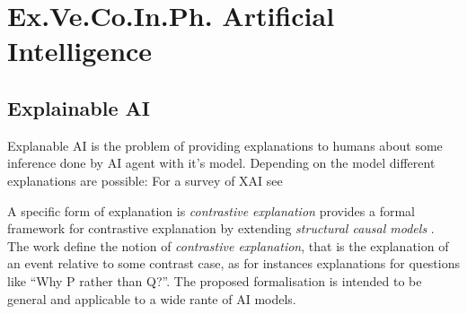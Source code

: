 \section{Ex.Ve.Co.In.Ph. Artificial Intelligence}
\subsection{Explainable AI} Explanable AI is the problem of providing
explanations to humans about some inference done by AI agent with it's
model. Depending on the model different explanations are possible:
For a survey of XAI see \cite{arrieta2020explainable}

A specific form of explanation is \emph{contrastive explanation}
\cite{miller2018contrastive} provides a formal framework for
contrastive explanation by extending \emph{structural causal models}
\cite{halpern2005causes1}.  The work define the notion of
\emph{contrastive explanation}, 
that is the explanation of an event relative to some contrast case, as
for instances explanations for questions like ``Why P rather than
Q?''. The proposed formalisation is intended to be general and
applicable to a wide rante of AI models.

